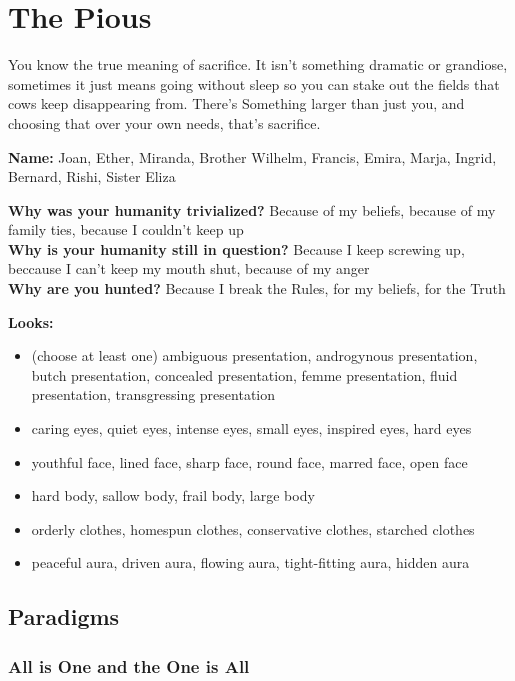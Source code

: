 \documentclass[
  oneside,
  statementpaper,
  9pt]{memoir}
\begin{document}
\newpage

\hypertarget{the-pious}{%
\section{The Pious}\label{the-pious}}

You know the true meaning of sacrifice. It isn't something dramatic or
grandiose, sometimes it just means going without sleep so you can stake
out the fields that cows keep disappearing from. There's Something
larger than just you, and choosing that over your own needs, that's
sacrifice.

\textbf{Name:} Joan, Ether, Miranda, Brother Wilhelm, Francis, Emira,
Marja, Ingrid, Bernard, Rishi, Sister Eliza

\textbf{Why was your humanity trivialized?} Because of my beliefs,
because of my family ties, because I couldn't keep up\\
\textbf{Why is your humanity still in question?} Because I keep screwing
up, beccause I can't keep my mouth shut, because of my anger\\
\textbf{Why are you hunted?} Because I break the Rules, for my beliefs,
for the Truth

\textbf{Looks:}

\begin{itemize}
\tightlist
\item
  (choose at least one) ambiguous presentation, androgynous
  presentation, butch presentation, concealed presentation, femme
  presentation, fluid presentation, transgressing presentation
\item
  caring eyes, quiet eyes, intense eyes, small eyes, inspired eyes, hard
  eyes
\item
  youthful face, lined face, sharp face, round face, marred face, open
  face
\item
  hard body, sallow body, frail body, large body
\item
  orderly clothes, homespun clothes, conservative clothes, starched
  clothes
\item
  peaceful aura, driven aura, flowing aura, tight-fitting aura, hidden
  aura
\end{itemize}

\hypertarget{paradigms-4}{%
\subsection{Paradigms}\label{paradigms-4}}

\hypertarget{all-is-one-and-the-one-is-all}{%
\subsubsection{All is One and the One is
All}\label{all-is-one-and-the-one-is-all}}
\end{document}
